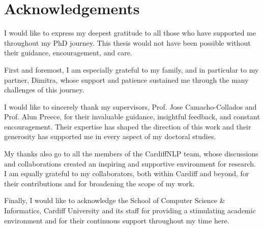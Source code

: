 \chapter*{Acknowledgements}
I would like to express my deepest gratitude to all those who have supported me throughout my PhD journey. This thesis would not have been possible without their guidance, encouragement, and care.  

First and foremost, I am especially grateful to my family, and in particular to my partner, Dimitra, whose support and patience sustained me through the many challenges of this journey.  

I would like to sincerely thank my supervisors, Prof. Jose Camacho-Collados and Prof. Alun Preece, for their invaluable guidance, insightful feedback, and constant encouragement. Their expertise has shaped the direction of this work and their generosity has supported me in every aspect of my doctoral studies.  

My thanks also go to all the members of the CardiffNLP team, whose discussions and collaborations created an inspiring and supportive environment for research. I am equally grateful to my collaborators, both within Cardiff and beyond, for their contributions and for broadening the scope of my work.  

Finally, I would like to acknowledge the School of Computer Science \& Informatics, Cardiff University and its staff for providing a stimulating academic environment and for their continuous support throughout my time here.  
